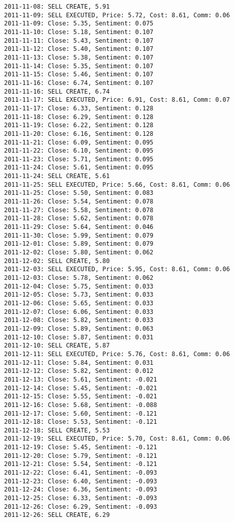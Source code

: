 \documentclass[11pt]{article}
\begin{document}
\begin{Verbatim}[commandchars=\\\{\}]
2011-11-08: SELL CREATE, 5.91
2011-11-09: SELL EXECUTED, Price: 5.72, Cost: 8.61, Comm: 0.06
2011-11-09: Close: 5.35, Sentiment: 0.075
2011-11-10: Close: 5.18, Sentiment: 0.107
2011-11-11: Close: 5.43, Sentiment: 0.107
2011-11-12: Close: 5.40, Sentiment: 0.107
2011-11-13: Close: 5.38, Sentiment: 0.107
2011-11-14: Close: 5.35, Sentiment: 0.107
2011-11-15: Close: 5.46, Sentiment: 0.107
2011-11-16: Close: 6.74, Sentiment: 0.107
2011-11-16: SELL CREATE, 6.74
2011-11-17: SELL EXECUTED, Price: 6.91, Cost: 8.61, Comm: 0.07
2011-11-17: Close: 6.33, Sentiment: 0.128
2011-11-18: Close: 6.29, Sentiment: 0.128
2011-11-19: Close: 6.22, Sentiment: 0.128
2011-11-20: Close: 6.16, Sentiment: 0.128
2011-11-21: Close: 6.09, Sentiment: 0.095
2011-11-22: Close: 6.10, Sentiment: 0.095
2011-11-23: Close: 5.71, Sentiment: 0.095
2011-11-24: Close: 5.61, Sentiment: 0.095
2011-11-24: SELL CREATE, 5.61
2011-11-25: SELL EXECUTED, Price: 5.66, Cost: 8.61, Comm: 0.06
2011-11-25: Close: 5.50, Sentiment: 0.083
2011-11-26: Close: 5.54, Sentiment: 0.078
2011-11-27: Close: 5.58, Sentiment: 0.078
2011-11-28: Close: 5.62, Sentiment: 0.078
2011-11-29: Close: 5.64, Sentiment: 0.046
2011-11-30: Close: 5.99, Sentiment: 0.079
2011-12-01: Close: 5.89, Sentiment: 0.079
2011-12-02: Close: 5.80, Sentiment: 0.062
2011-12-02: SELL CREATE, 5.80
2011-12-03: SELL EXECUTED, Price: 5.95, Cost: 8.61, Comm: 0.06
2011-12-03: Close: 5.78, Sentiment: 0.062
2011-12-04: Close: 5.75, Sentiment: 0.033
2011-12-05: Close: 5.73, Sentiment: 0.033
2011-12-06: Close: 5.65, Sentiment: 0.033
2011-12-07: Close: 6.06, Sentiment: 0.033
2011-12-08: Close: 5.82, Sentiment: 0.033
2011-12-09: Close: 5.89, Sentiment: 0.063
2011-12-10: Close: 5.87, Sentiment: 0.031
2011-12-10: SELL CREATE, 5.87
2011-12-11: SELL EXECUTED, Price: 5.76, Cost: 8.61, Comm: 0.06
2011-12-11: Close: 5.84, Sentiment: 0.031
2011-12-12: Close: 5.82, Sentiment: 0.012
2011-12-13: Close: 5.61, Sentiment: -0.021
2011-12-14: Close: 5.45, Sentiment: -0.021
2011-12-15: Close: 5.55, Sentiment: -0.021
2011-12-16: Close: 5.68, Sentiment: -0.088
2011-12-17: Close: 5.60, Sentiment: -0.121
2011-12-18: Close: 5.53, Sentiment: -0.121
2011-12-18: SELL CREATE, 5.53
2011-12-19: SELL EXECUTED, Price: 5.70, Cost: 8.61, Comm: 0.06
2011-12-19: Close: 5.45, Sentiment: -0.121
2011-12-20: Close: 5.79, Sentiment: -0.121
2011-12-21: Close: 5.54, Sentiment: -0.121
2011-12-22: Close: 6.41, Sentiment: -0.093
2011-12-23: Close: 6.40, Sentiment: -0.093
2011-12-24: Close: 6.36, Sentiment: -0.093
2011-12-25: Close: 6.33, Sentiment: -0.093
2011-12-26: Close: 6.29, Sentiment: -0.093
2011-12-26: SELL CREATE, 6.29

\end{Verbatim}
\end{document}
